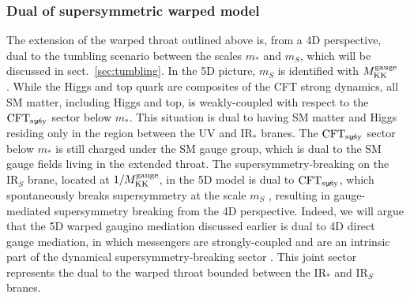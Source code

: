 \documentclass[a4paper,12pt]{article}
\def\sec#1{sect.~\ref{#1}}
\def\mst{m_*}
\def\mS{m_S}
\def\CFTs{{\rm CFT}_ {{\rm susy}\! \! \! \! \! \! \! \!\diagup \,\,\,}}
\begin{document}
\subsubsection*{Dual of supersymmetric warped model}
The extension of the warped throat outlined above is, from a 4D perspective, dual to the tumbling scenario 
between the scales $\mst$ and $\mS$, which will be discussed in \sec{sec:tumbling}. In the 5D picture, $\mS$ is identified with $M^{ \rm gauge }_{ \rm KK }$  \cite{Agashe:2016rle}.
While the Higgs and top quark are composites of the CFT strong dynamics, 
all SM matter, including Higgs and top, is weakly-coupled with respect to the $\CFTs$ sector below $\mst$. This situation is dual to having SM matter and Higgs residing only in the region between the UV and IR$_*$ branes. 
 The $\CFTs$ sector below $\mst$
is still charged under the SM gauge group, which is dual to the SM gauge fields living in the extended throat.
The 
supersymmetry-breaking on the IR$_S$ brane, located at $1/ M^{ \rm gauge }_{ \rm KK }$,
in the 5D model is dual to $\CFTs$, which spontaneously breaks supersymmetry at the scale $\mS$ \cite{Gherghetta:2000kr},
resulting in gauge-mediated supersymmetry breaking from the 4D perspective.
Indeed, we will argue that the 5D warped gaugino mediation discussed earlier is dual 
to 4D direct gauge mediation, in which messengers are strongly-coupled and are an intrinsic part of the dynamical supersymmetry-breaking sector \cite{Nomura:2004zs,Abel:2010vb,Benini:2009ff}.
This joint sector represents the dual to the warped throat bounded between the IR$_*$ and IR$_S$ branes.
\end{document}
